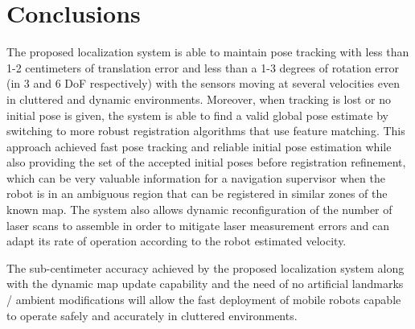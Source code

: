 \section{Conclusions}\label{sec:conclusions}

The proposed localization system is able to maintain pose tracking with less than 1-2 centimeters of translation error and less than a 1-3 degrees of rotation error (in 3 and 6 DoF respectively) with the sensors moving at several velocities even in cluttered and dynamic environments. Moreover, when tracking is lost or no initial pose is given, the system is able to find a valid global pose estimate by switching to more robust registration algorithms that use feature matching. This approach achieved fast pose tracking and reliable initial pose estimation while also providing the set of the accepted initial poses before registration refinement, which can be very valuable information for a navigation supervisor when the robot is in an ambiguous region that can be registered in similar zones of the known map. The system also allows dynamic reconfiguration of the number of laser scans to assemble in order to mitigate laser measurement errors and can adapt its rate of operation according to the robot estimated velocity.

The sub-centimeter accuracy achieved by the proposed localization system along with the dynamic map update capability and the need of no artificial landmarks / ambient modifications will allow the fast deployment of mobile robots capable to operate safely and accurately in cluttered environments.
